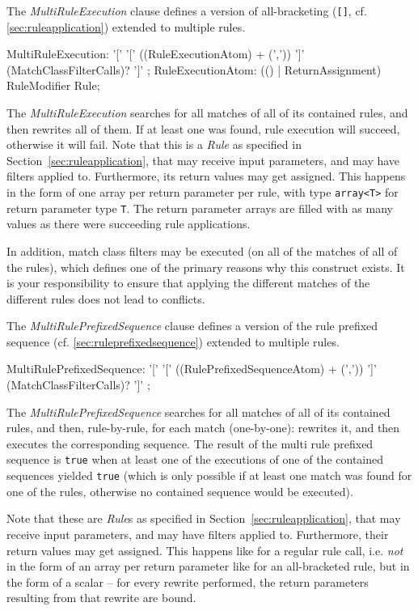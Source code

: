 The \emph{MultiRuleExecution} clause defines a version of all-bracketing (\texttt{[]}, cf. \ref{sec:ruleapplication}) extended to multiple rules.

\begin{rail}
  MultiRuleExecution: '[' '[' ((RuleExecutionAtom) + (',')) ']' (MatchClassFilterCalls)? ']' ;
  RuleExecutionAtom: (() | ReturnAssignment) RuleModifier Rule;
\end{rail}

The \emph{MultiRuleExecution} searches for all matches of all of its contained rules, and then rewrites all of them.
If at least one was found, rule execution will succeed, otherwise it will fail. 
Note that this is a \emph{Rule} as specified in Section~\ref{sec:ruleapplication}, that may receive input parameters, and may have filters applied to.
Furthermore, its return values may get assigned.
This happens in the form of one array per return parameter per rule, with type \verb#array<T># for return parameter type \verb#T#.
The return parameter arrays are filled with as many values as there were succeeding rule applications.

In addition, match class filters may be executed (on all of the matches of all of the rules), which defines one of the primary reasons why this construct exists.
It is your responsibility to ensure that applying the different matches of the different rules does not lead to conflicts.

The \emph{MultiRulePrefixedSequence} clause defines a version of the rule prefixed sequence (cf. \ref{sec:ruleprefixedsequence}) extended to multiple rules.

\begin{rail}
  MultiRulePrefixedSequence: '[' '[' ((RulePrefixedSequenceAtom) + (',')) ']' (MatchClassFilterCalls)? ']' ;
\end{rail}

The \emph{MultiRulePrefixedSequence} searches for all matches of all of its contained rules, and then, rule-by-rule, for each match (one-by-one): rewrites it, and then executes the corresponding sequence.
The result of the multi rule prefixed sequence is \texttt{true} when at least one of the executions of one of the contained sequences yielded \texttt{true} (which is only possible if at least one match was found for one of the rules, otherwise no contained sequence would be executed).

Note that these are \emph{Rule}s as specified in Section~\ref{sec:ruleapplication}, that may receive input parameters, and may have filters applied to.
Furthermore, their return values may get assigned.
This happens like for a regular rule call, i.e. \emph{not} in the form of an array per return parameter like for an all-bracketed rule, but in the form of a scalar -- for every rewrite performed, the return parameters resulting from that rewrite are bound.

